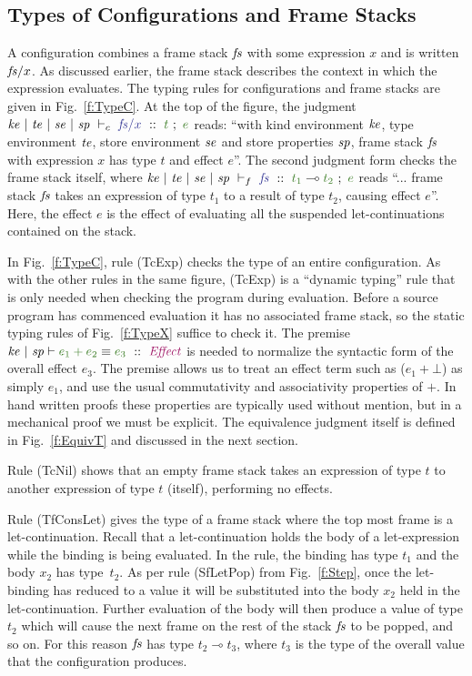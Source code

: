 
\pagebreak{}
\subsection{Types of Configurations and Frame Stacks}
\label{s:Configurations}

A configuration combines a frame stack $\mathit{fs}$ with some expression $x$ and is written $\mathit{fs}/x$. As discussed earlier, the frame stack describes the context in which the expression evaluates. The typing rules for configurations and frame stacks are given in Fig.~\ref{f:TypeC}. At the top of the figure, the judgment $\TypeC{\mke}{\mte}{\mse}{\msp}{\mfs}{x}{t}{e}$ reads: ``with kind environment $\mathit{ke}$, type environment $\mathit{te}$, store environment $\mathit{se}$ and store properties $\mathit{sp}$, frame stack $\mathit{fs}$ with expression $x$ has type $t$ and effect $e$''. The second judgment form checks the frame stack itself, where $\TypeF{\mke}{\mte}{\mse}{\msp}{\mfs}{t_1}{t_2}{e}$ reads ``... frame stack $\mathit{fs}$ takes an expression of type $t_1$ to a result of type $t_2$, causing effect $e$''. Here, the effect $e$ is the effect of evaluating all the suspended let-continuations contained on the stack.

In Fig.~\ref{f:TypeC}, rule (TcExp) checks the type of an entire configuration. As with the other rules in the same figure, (TcExp) is a ``dynamic typing'' rule that is only needed when checking the program during evaluation. Before a source program has commenced evaluation it has no associated frame stack, so the static typing rules of Fig.~\ref{f:TypeX} suffice to check it. The premise $\EquivT{\mke}{\msp}{e_1 + e_2}{e_3}{\kcEffect}$ is needed to normalize the syntactic form of the overall effect $e_3$. The premise allows us to treat an effect term such as ($e_1 + \bot$) as simply $e_1$, and use the usual commutativity and associativity properties of $+$. In hand written proofs these properties are typically used without mention, but in a mechanical proof we must be explicit. The equivalence judgment itself is defined in Fig.~\ref{f:EquivT} and discussed in the next section.

Rule (TcNil) shows that an empty frame stack takes an expression of type $t$ to another expression of type $t$ (itself), performing no effects. 

Rule (TfConsLet) gives the type of a frame stack where the top most frame is a let-continuation. Recall that a let-continuation holds the body of a let-expression while the binding is being evaluated. In the rule, the binding has type $t_1$ and the body $x_2$ has type~$t_2$. As per rule (SfLetPop) from Fig.~\ref{f:Step}, once the let-binding has reduced to a value it will be substituted into the body $x_2$ held in the let-continuation. Further evaluation of the body will then produce a value of type $t_2$ which will cause the next frame on the rest of the stack $\mathit{fs}$ to be popped, and so on. For this reason $\mathit{fs}$ has type $t_2 \multimap t_3$, where $t_3$ is the type of the overall value that the configuration produces. 

